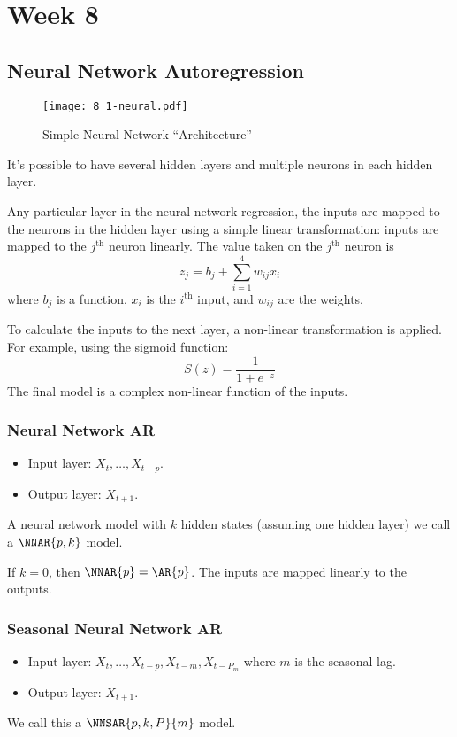 \chapter{Week 8}
\section{Neural Network Autoregression}
\begin{figure}[!htbp]
    \centering
    \texttt{[image: 8\_1-neural.pdf]}
    \caption{Simple Neural Network ``Architecture''}
\end{figure}
It's possible to have several hidden layers and multiple
neurons in each hidden layer.

Any particular layer in the neural network regression,
the inputs are mapped to the neurons in the hidden layer using
a simple linear transformation: inputs
are mapped to the $ j^{\text{th}} $ neuron linearly. The value taken on the $ j^{\text{th}} $
neuron is
\[ z_j=b_j+\sum_{i=1}^{4} w_{ij}x_{i} \]
where $ b_j $ is a function, $ x_i $ is the $ i^{\text{th}} $ input, and $ w_{ij} $
are the weights.

To calculate the inputs to the next layer, a non-linear transformation
is applied. For example, using the sigmoid function:
\[ S(z)=\frac{1}{1+e^{-z}} \]
The final model is a complex non-linear function of the inputs.

\subsection*{Neural Network AR}
\begin{itemize}
    \item Input layer: $ X_t,\ldots,X_{t-p} $.
    \item Output layer: $ X_{t+1} $.
\end{itemize}
A neural network model with $ k $ hidden states (assuming one hidden layer)
we call a $ \NNAR{p,k} $ model.
\begin{Remark}{}{}
    If $ k=0 $, then $ \NNAR{p}=\AR{p} $. The inputs are mapped
    linearly to the outputs.
\end{Remark}
\subsection*{Seasonal Neural Network AR}
\begin{itemize}
    \item Input layer: $ X_{t},\ldots,X_{t-p},X_{t-m},X_{t-P_m} $
          where $ m $ is the seasonal lag.
    \item Output layer: $ X_{t+1} $.
\end{itemize}
We call this a $ \NNSAR{p,k,P}{m} $ model.

